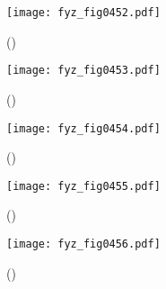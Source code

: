     \begin{figure}[ht!] %
      \centering
      \texttt{[image: fyz\_fig0452.pdf]}
      \caption{ 
               (\cite[s.~707]{Feynman01})}
      \label{fyz:fig0452}
    \end{figure}
    
    \begin{figure}[ht!] %
      \centering
      \texttt{[image: fyz\_fig0453.pdf]}
      \caption{ 
               (\cite[s.~707]{Feynman01})}
      \label{fyz:fig0453}
    \end{figure}
    
    \begin{figure}[ht!] %
      \centering
      \texttt{[image: fyz\_fig0454.pdf]}
      \caption{ 
               (\cite[s.~707]{Feynman01})}
      \label{fyz:fig0454}
    \end{figure}
    
    \begin{figure}[ht!] %
      \centering
      \texttt{[image: fyz\_fig0455.pdf]}
      \caption{ 
               (\cite[s.~707]{Feynman01})}
      \label{fyz:fig0455}
    \end{figure}
    
    \begin{figure}[ht!] %
      \centering
      \texttt{[image: fyz\_fig0456.pdf]}
      \caption{ 
               (\cite[s.~707]{Feynman01})}
      \label{fyz:fig0456}
    \end{figure}

